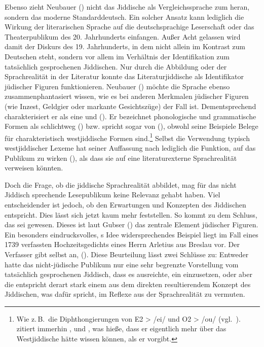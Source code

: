Ebenso zieht Neubauer (\citeyear{Neubauer1994}) nicht das Jiddische als Vergleichssprache zum \hai{{\LiJi}} heran, sondern das moderne Standarddeutsch. 
Ein solcher Ansatz kann lediglich die Wirkung der literarischen Sprache auf die deutschsprachige Leserschaft oder das Theaterpublikum des 20. Jahrhunderts einfangen. Außer Acht gelassen wird damit der Diskurs des 19. Jahrhunderts, in dem  nicht allein im Kontrast zum Deutschen steht, sondern vor allem im Verhältnis der Identifikation zum tatsächlich gesprochenen Jiddischen. Nur durch die Abbildung oder  der Sprachrealität in der Literatur konnte das Literaturjiddische als Identifikator jüdischer Figuren funktionieren. Neubauer (\citeyear{Neubauer1994}) möchte die Sprache ebenso zusammenphantasiert wissen, wie es bei anderen Merkmalen jüdischer Figuren (wie Inzest, Geldgier oder markante Gesichtszüge) der Fall ist. Dementsprechend charakterisiert er \hai{{\LiJi}} als eine  und  (\citealt[144]{Neubauer1994}). Er bezeichnet phonologische und grammatische Formen als schlichtweg  (\citealt[143,\,145,\,155]{Neubauer1994}) bzw. spricht sogar von  (\citealt[154,\,155]{Neubauer1994}), obwohl seine Beispiele Belege für charakteristisch westjiddische Formen sind.\footnote{Wie z.\,B.\, die Diphthongierungen von E2 > /ei/ und O2 > /ou/ (vgl.\, \citealt[143]{Neubauer1994}). \cite{Neubauer1994} zitiert immerhin \cite{Timm1985}, \cite{Beraneck1965} und \cite{Mieses1915}, was hieße, dass er eigentlich mehr über das Westjiddische hätte wissen können, als er vorgibt.} Selbst die Verwendung typisch westjiddischer Lexeme hat seiner Auffassung nach lediglich die Funktion,  auf das Publikum zu wirken (\citealt[142]{Neubauer1994}), als dass sie auf eine literaturexterne Sprachrealität verweisen könnten. 

Doch die Frage, ob \hai{{\LiJi}} die jiddische Sprachrealität abbildet, mag für das nicht Jiddisch sprechende Lesepublikum keine Relevanz gehabt haben. Viel entscheidender ist jedoch, ob \hai{{\LiJi}} den Erwartungen und Konzepten des Jiddischen entspricht. Dies lässt sich jetzt kaum mehr feststellen. So kommt \cite{Gubser1998} zu dem Schluss, das \hai{{\LiJi}} sei  gewesen. Dieses  ist laut Gubser (\citeyear[138f]{Gubser1998}) das zentrale Element jüdischer Figuren. Ein besonders eindrucksvolles, \citeauthor{Gubser1998}s Idee widersprechendes Beispiel liegt im Fall eines 1739 verfassten Hochzeitsgedichts eines Herrn Arletius aus Breslau vor. Der Verfasser gibt selbst an,  (\citealt[281]{Arletius1800}). Diese Beurteilung lässt zwei Schlüsse zu: Entweder hatte das nicht-jüdische Publikum nur eine sehr begrenzte Vorstellung vom tatsächlich gesprochenen Jiddisch, dass es ausreichte, ein  einzusetzen, oder aber die  entspricht derart stark einem aus dem direkten  resultierendem Konzept des Jiddischen, was dafür spricht, im \hai{{\LiJi}} Reflexe aus der Sprachrealität zu vermuten.

